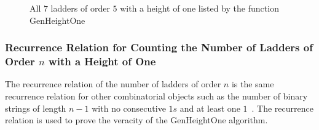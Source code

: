 \begin{figure}[!htp]
\begin{center}
        \end{center}
        \caption{All $7$ ladders of order $5$ with a height of one listed by the function {\sc GenHeightOne}}
        \label{Fig:GenHeightOne}
   \end{figure}

   \subsubsection{Recurrence Relation for Counting the Number of Ladders of Order $n$ with a Height of One}
   The recurrence relation of the number of ladders of order $n$ is the same recurrence relation for 
   other combinatorial objects such as the number of binary strings of length $n-1$ with no consecutive $1s$ 
   and at least one $1$~\cite{A8}\cite{A11}. The recurrence relation is used to prove the veracity of the {\sc GenHeightOne} algorithm.\par 
   
